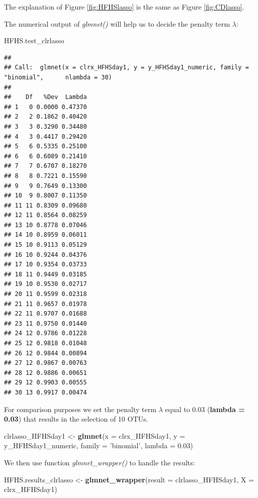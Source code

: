 \documentclass[openany]{book}
\newenvironment{Shaded}{\begin{snugshade}}{\end{snugshade}}
\newcommand{\KeywordTok}[1]{\textcolor[rgb]{0.13,0.29,0.53}{\textbf{#1}}}
\newcommand{\DataTypeTok}[1]{\textcolor[rgb]{0.13,0.29,0.53}{#1}}
\newcommand{\FloatTok}[1]{\textcolor[rgb]{0.00,0.00,0.81}{#1}}
\newcommand{\StringTok}[1]{\textcolor[rgb]{0.31,0.60,0.02}{#1}}
\newcommand{\NormalTok}[1]{#1}
\begin{document}
The explanation of Figure \ref{fig:HFHSlasso} is the same as Figure
\ref{fig:CDlasso}.

The numerical output of \emph{glmnet()} will help us to decide the
penalty term \(\lambda\):

\begin{Shaded}
\begin{Highlighting}[]
\NormalTok{HFHS.test_clrlasso}
\end{Highlighting}
\end{Shaded}

\begin{verbatim}
## 
## Call:  glmnet(x = clrx_HFHSday1, y = y_HFHSday1_numeric, family = "binomial",      nlambda = 30) 
## 
##    Df   %Dev  Lambda
## 1   0 0.0000 0.47370
## 2   2 0.1862 0.40420
## 3   3 0.3290 0.34480
## 4   3 0.4417 0.29420
## 5   6 0.5335 0.25100
## 6   6 0.6089 0.21410
## 7   7 0.6707 0.18270
## 8   8 0.7221 0.15590
## 9   9 0.7649 0.13300
## 10  9 0.8007 0.11350
## 11 11 0.8309 0.09680
## 12 11 0.8564 0.08259
## 13 10 0.8778 0.07046
## 14 10 0.8959 0.06011
## 15 10 0.9113 0.05129
## 16 10 0.9244 0.04376
## 17 10 0.9354 0.03733
## 18 11 0.9449 0.03185
## 19 10 0.9530 0.02717
## 20 11 0.9599 0.02318
## 21 11 0.9657 0.01978
## 22 11 0.9707 0.01688
## 23 11 0.9750 0.01440
## 24 12 0.9786 0.01228
## 25 12 0.9818 0.01048
## 26 12 0.9844 0.00894
## 27 12 0.9867 0.00763
## 28 12 0.9886 0.00651
## 29 12 0.9903 0.00555
## 30 13 0.9917 0.00474
\end{verbatim}

For comparison purposes we set the penalty term \(\lambda\) equal to
0.03 (\textbf{lambda = 0.03}) that results in the selection of 10 OTUs.

\begin{Shaded}
\begin{Highlighting}[]
\NormalTok{clrlasso_HFHSday1 <-}\StringTok{ }\KeywordTok{glmnet}\NormalTok{(}\DataTypeTok{x =}\NormalTok{ clrx_HFHSday1, }\DataTypeTok{y =}\NormalTok{ y_HFHSday1_numeric, }
                         \DataTypeTok{family =} \StringTok{'binomial'}\NormalTok{, }\DataTypeTok{lambda =} \FloatTok{0.03}\NormalTok{)}
\end{Highlighting}
\end{Shaded}

We then use function \emph{glmnet\_wrapper()} to handle the results:

\begin{Shaded}
\begin{Highlighting}[]
\NormalTok{HFHS.results_clrlasso <-}\StringTok{ }\KeywordTok{glmnet_wrapper}\NormalTok{(}\DataTypeTok{result =}\NormalTok{ clrlasso_HFHSday1, }\DataTypeTok{X =}\NormalTok{ clrx_HFHSday1) }
\end{Highlighting}
\end{Shaded}
\end{document}
